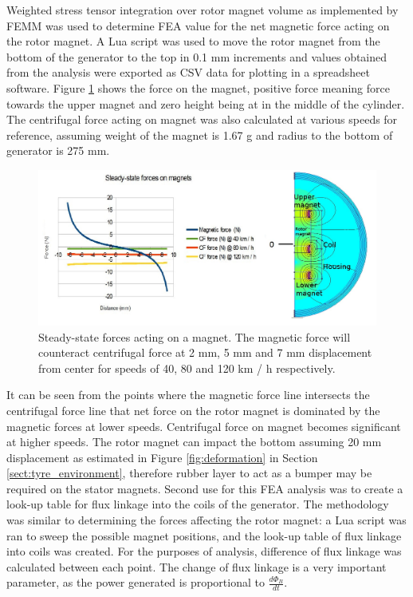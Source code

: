 Weighted stress tensor integration over rotor magnet volume as implemented by FEMM was used to determine FEA value for the net magnetic force acting on the rotor magnet. A Lua script was used to move the rotor magnet from the bottom of the generator to the top in 0.1 mm increments and values obtained from the analysis were exported as CSV data for plotting in a spreadsheet software. Figure \ref{femm_forces} shows the force on the magnet, positive force meaning force towards the upper magnet and zero height being at in the middle of the cylinder. The centrifugal force acting on magnet was also calculated at various speeds for reference, assuming weight of the magnet is 1.67 g and radius to the bottom of generator is 275 mm.

\begin{figure}[htb]
  \begin{center}
  \includegraphics[width=\columnwidth]{images/own_dwg/femm_fvsd_dualmagnet.jpg}
  \end{center}
  \caption{\label{femm_forces} Steady-state forces acting on a magnet. The magnetic force will counteract centrifugal force at 2 mm, 5 mm and 7 mm displacement from center for speeds of 40, 80 and 120 km / h respectively.}
\end{figure}

It can be seen from the points where the magnetic force line intersects the centrifugal force line that net force on the rotor magnet is dominated by the magnetic forces at lower speeds. Centrifugal force on magnet becomes significant at higher speeds. The rotor magnet can impact the bottom assuming 20 mm displacement as estimated in Figure \ref{fig:deformation} in Section \ref{sect:tyre_environment}, therefore rubber layer to act as a bumper may be required on the stator magnets. Second use for this FEA analysis was to create a look-up table for flux linkage into the coils of the generator. The methodology was similar to determining the forces affecting the rotor magnet: a Lua script was ran to sweep the possible magnet positions, and the look-up table of flux linkage into coils was created. For the purposes of analysis, difference of flux linkage was calculated between each point. The change of flux linkage is a very important parameter, as the power generated is proportional to $\frac{d \Phi_{B}}{d t}$. 

